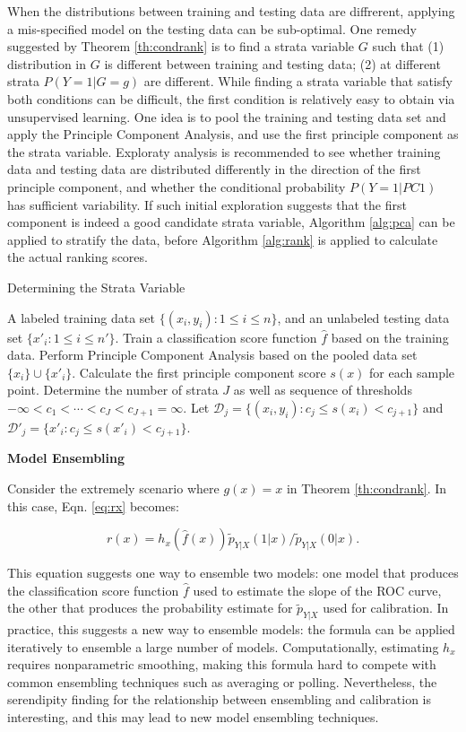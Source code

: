 \documentclass{article} %
\begin{document}
When the distributions between training and testing data are diffrerent, applying a mis-specified model on the testing data can be sub-optimal. One remedy suggested by Theorem \ref{th:condrank} is to find a strata variable $G$ such that (1) distribution in $G$ is different between training and testing data; (2) at different strata $P(Y=1|G=g)$ are different. While finding a strata variable that satisfy both conditions can be difficult, the first condition is relatively easy to obtain via unsupervised learning. One idea is to pool the training and testing data set and apply the Principle Component Analysis, and use the first principle component as the strata variable. Exploraty analysis is recommended to see whether training data and testing data are distributed differently in the direction of the first principle component, and whether the conditional probability $P(Y=1|PC1)$ has sufficient variability. If such initial exploration suggests that the first component is indeed a good candidate strata variable, Algorithm \ref{alg:pca} can be applied to stratify the data, before Algorithm \ref{alg:rank} is applied to calculate the actual ranking scores.

\begin{algorithm}
\caption{Determining the Strata Variable}
\label{alg:pca}
\begin{algorithmic}[1]
\REQUIRE A labeled training data set $\{(x_{i},y_{i}):1\leq i\leq n\}$, and an unlabeled testing data set $\{x'_{i}:1\leq i\leq n'\}$.
\STATE Train a classification score function $\hat f$ based on the training data.
\STATE Perform Principle Component Analysis based on the pooled data set $\{x_{i}\}\cup\{x'_{i}\}$. Calculate the first principle component score $s(x)$ for each sample point.
\STATE Determine the number of strata $J$ as well as sequence of thresholds $-\infty < c_1 <\cdots<c_J<c_{J+1}=\infty$. Let $\mathcal D_j=\{(x_{i},y_{i}):c_j\leq s(x_i)<c_{j+1}\}$ and $\mathcal D'_j=\{x'_{i}:c_j\leq s(x'_i)<c_{j+1}\}$.
\end{algorithmic}
\end{algorithm}

\textbf{Model Ensembling}\label{eq:ensemble}

Consider the extremely scenario where $g(x)=x$ in Theorem \ref{th:condrank}. In this case, Eqn. \ref{eq:rx} becomes:

\[
r(x)=h_x(\hat f(x))\tilde p_{Y|X}(1|x)/\tilde p_{Y|X}(0|x).
\]

This equation suggests one way to ensemble two models: one model that produces the classification score function $\hat f$ used to estimate the slope of the ROC curve, the other that produces the probability estimate for $\tilde p_{Y|X}$ used for calibration. In practice, this suggests a new way to ensemble models: the formula can be applied iteratively to ensemble a large number of models. Computationally, estimating $h_x$ requires nonparametric smoothing, making this formula hard to compete with common ensembling techniques such as averaging or polling. Nevertheless, the serendipity finding for the relationship between ensembling and calibration is interesting, and this may lead to new model ensembling techniques.
\end{document}
